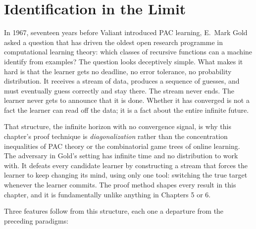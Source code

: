 %

\chapter{Identification in the Limit}
\label{ch:gold}

In 1967, seventeen years before Valiant introduced PAC learning, E.\ Mark Gold asked a question that has driven the oldest open research programme in computational learning theory: which classes of recursive functions can a machine identify from examples? The question looks deceptively simple. What makes it hard is that the learner gets no deadline, no error tolerance, no probability distribution. It receives a stream of data, produces a sequence of guesses, and must eventually guess correctly and stay there. The stream never ends. The learner never gets to announce that it is done. Whether it has converged is not a fact the learner can read off the data; it is a fact about the entire infinite future.

That structure, the infinite horizon with no convergence signal, is why this chapter's proof technique is \emph{diagonalization} rather than the concentration inequalities of PAC theory or the combinatorial game trees of online learning. The adversary in Gold's setting has infinite time and no distribution to work with. It defeats every candidate learner by constructing a stream that forces the learner to keep changing its mind, using only one tool: switching the true target whenever the learner commits. The proof method shapes every result in this chapter, and it is fundamentally unlike anything in Chapters 5 or 6.

Three features follow from this structure, each one a departure from the preceding paradigms:

